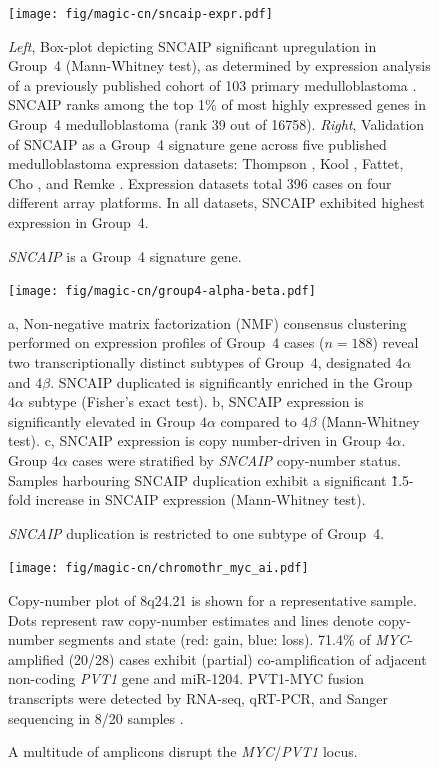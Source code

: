 \documentclass[11pt,letterpaper]{article}
\theoremstyle{definition}
\begin{document}
\begin{figure}[h]
	\begin{center}
		\texttt{[image: fig/magic-cn/sncaip-expr.pdf]}
	\end{center}
	\caption{\emph{SNCAIP} is a Group~4 signature gene.}
	\emph{Left}, Box-plot depicting SNCAIP significant upregulation in Group~4 (Mann-Whitney test), as determined by expression analysis of a previously published cohort of 103 primary medulloblastoma . SNCAIP ranks among the top 1\% of most highly expressed genes in Group~4 medulloblastoma (rank 39 out of 16758).
	\emph{Right}, Validation of SNCAIP as a Group~4 signature gene across five published medulloblastoma expression datasets: Thompson , Kool , Fattet, Cho , and Remke . Expression datasets total 396 cases on four different array platforms. In all datasets, SNCAIP exhibited highest expression in Group~4.
	\label{fig:sncaip-expr}
\end{figure}

\begin{figure}[h]
	\begin{center}
		\texttt{[image: fig/magic-cn/group4-alpha-beta.pdf]}
	\end{center}
	\caption{\emph{SNCAIP} duplication is restricted to one subtype of Group~4.}
	\textsf{a}, Non-negative matrix factorization (NMF) consensus clustering performed on expression profiles of Group~4 cases ($n = 188$) reveal two transcriptionally distinct subtypes of Group~4, designated $4\alpha$ and $4\beta$. SNCAIP duplicated is significantly enriched in the Group $4\alpha$ subtype (Fisher's exact test).
	\textsf{b}, SNCAIP expression is significantly elevated in Group $4\alpha$ compared to $4\beta$ (Mann-Whitney test).
	\textsf{c}, SNCAIP expression is copy number-driven in Group $4\alpha$. Group $4\alpha$ cases were stratified by \emph{SNCAIP} copy-number status. Samples harbouring SNCAIP duplication exhibit a significant \~1.5-fold increase in SNCAIP expression (Mann-Whitney test).
	\label{fig:group4-alpha-beta}
\end{figure}

\clearpage

\begin{figure}[h]
	\begin{center}
		\texttt{[image: fig/magic-cn/chromothr\_myc\_ai.pdf]}
	\end{center}
	\caption{A multitude of amplicons disrupt the \emph{MYC}/\emph{PVT1} locus.}
	Copy-number plot of 8q24.21 is shown for a representative sample. Dots represent raw copy-number estimates and lines denote copy-number segments and state (red: gain, blue: loss). 71.4\% of \emph{MYC}-amplified (20/28) cases exhibit (partial) co-amplification of adjacent non-coding \emph{PVT1} gene and miR-1204. PVT1-MYC fusion transcripts were detected by RNA-seq, qRT-PCR, and Sanger sequencing in 8/20 samples .
	\label{fig:chromothr_myc}
\end{figure}
\end{document}
